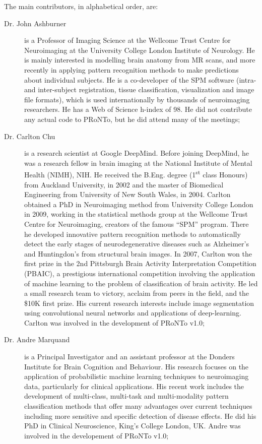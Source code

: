 The main contributors, in alphabetical order, are: 
\begin{description}
	\item[Dr. John Ashburner] is a Professor of Imaging Science at the Wellcome Trust Centre for Neuroimaging at the University College London Institute of Neurology. He is mainly interested in modelling brain anatomy from MR scans, and more recently in applying pattern recognition methods to make predictions about individual subjects. He is a co-developer of the SPM software (intra- and inter-subject registration, tissue classification, visualization and image file formats), which is used internationally by thousands of neuroimaging researchers. He has a Web of Science h-index of 98.  He did not contribute any actual code to PRoNTo, but he did attend many of the meetings;
    \item[Dr. Carlton Chu] is a research scientist at  Google DeepMind. Before joining DeepMind, he was a research fellow in brain imaging at the National Institute of Mental Health (NIMH), NIH. He received the B.Eng. degree (1\textsuperscript{st} class Honours) from Auckland University, in 2002 and the master of Biomedical Engineering from University of New South Wales, in 2004. Carlton obtained a PhD in Neuroimaging method from University College London in 2009, working in the statistical methods group at the Wellcome Trust Centre for Neuroimaging, creators of the famous ``SPM'' program. There he developed innovative pattern recognition methods to automatically detect the early stages of neurodegenerative diseases such as Alzheimer's and Huntingdon's from structural brain images. In 2007, Carlton won the first prize in the 2nd Pittsburgh Brain Activity Interpretation Competition (PBAIC), a prestigious international competition involving the application of machine learning to the problem of classification of brain activity. He led a small research team to victory, acclaim from peers in the field, and the \$10K first prize. His current research interests include image segmentation using convolutional neural networks and applications of deep-learning. Carlton was involved in the development of PRoNTo v1.0;
	\item[Dr. Andre Marquand] is a Principal Investigator and an assistant professor at the Donders Institute for Brain Cognition and Behaviour. His research focuses on the application of probabilistic machine learning techniques to neuroimaging data, particularly for clinical applications. His recent work includes the development of multi-class, multi-task and multi-modality pattern classification methods that offer many advantages over current techniques including more sensitive and specific detection of disease effects. He did his PhD in Clinical Neuroscience, King's College London, UK. Andre was involved in the developement of PRoNTo v1.0;

\end{description}
